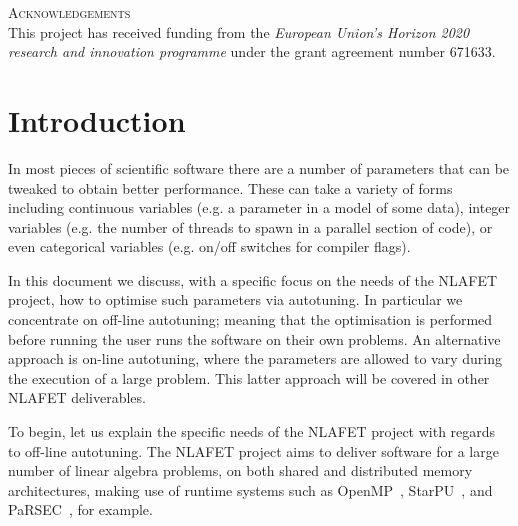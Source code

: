 \documentclass[a4paper,12pt]{article}
\begin{document}
\noindent
\textsc{Acknowledgements}\\[1em]
This project has received funding from the \emph{European Union's Horizon 2020 research and innovation programme} under the grant agreement number 671633.





%

\newpage

\renewcommand{\contentsname}{Table of Contents}
\tableofcontents

\listoffigures



\newpage

%

\section{Introduction}
\label{sec.introduction}
In most pieces of scientific software there are a number of parameters
that can be tweaked to obtain better performance.  These can take a
variety of forms including continuous variables (e.g. a parameter in a
model of some data), integer variables (e.g. the number of threads to
spawn in a parallel section of code), or even categorical variables
(e.g. on/off switches for compiler flags).

In this document we discuss, with a specific focus on the needs of the
NLAFET project, how to optimise such parameters via autotuning.  In
particular we concentrate on off-line autotuning; meaning that the
optimisation is performed before running the user runs the software on
their own problems.  An alternative approach is on-line autotuning,
where the parameters are allowed to vary during the execution of a
large problem.  This latter approach will be covered in other NLAFET
deliverables.

To begin, let us explain the specific needs of the NLAFET project with
regards to off-line autotuning.  The NLAFET project aims to deliver
software for a large number of linear algebra problems, on both shared
and distributed memory architectures, making use of runtime systems
such as OpenMP~\cite{ayguade2009design},
StarPU~\cite{AugThiNamWac11CCPE}, and PaRSEC~\cite{bosilca2013parsec},
for example.
\end{document}
